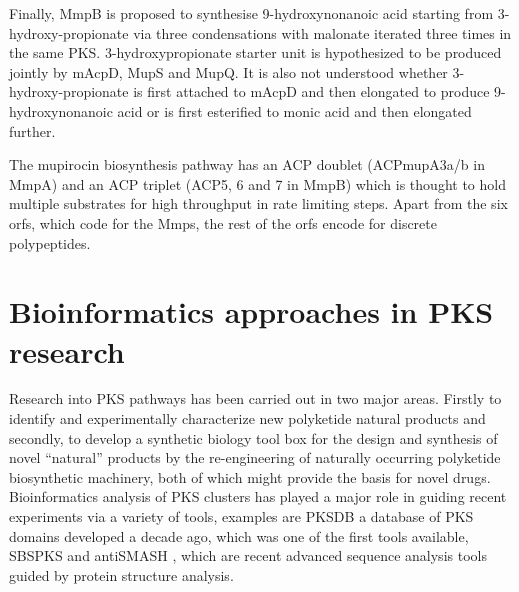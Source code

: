 		Finally, MmpB is proposed to synthesise 9-hydroxynonanoic acid starting from 3-hydroxy-propionate via three condensations with malonate iterated three times in the same PKS.  3-hydroxypropionate starter unit is hypothesized to be produced jointly by mAcpD, MupS and MupQ. It is also not understood whether 3-hydroxy-propionate is first attached to mAcpD and then elongated to produce 9-hydroxynonanoic acid or is first esterified to monic acid and then elongated further.
		
		The mupirocin biosynthesis pathway has an ACP doublet (ACPmupA3a/b in MmpA) and an ACP triplet (ACP5, 6 and 7 in MmpB) which is thought to hold multiple substrates for high throughput in rate limiting steps. Apart from the six orfs, which code for the Mmps, the rest of the orfs encode for discrete polypeptides.
		
	\section{Bioinformatics approaches in PKS research}
	\label{sec:BioinfoPKS}
	Research into PKS pathways has been carried out in two major areas. Firstly to identify and experimentally characterize new polyketide natural products and secondly, to develop a synthetic biology tool box for the design and synthesis of novel “natural” products by the re-engineering of naturally occurring polyketide biosynthetic machinery, both of which might provide the basis for novel drugs. Bioinformatics analysis of PKS clusters has played a major role in guiding recent experiments via a variety of tools, examples are PKSDB \parencite{Yadav2003} a database of PKS domains developed a decade ago, which was one of the first tools available, SBSPKS \parencite{Anand2010} and antiSMASH \parencite{Medema2011}, which are recent advanced sequence analysis tools guided by protein structure analysis.
	
